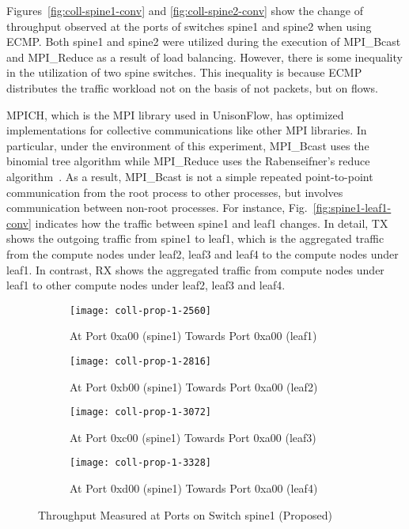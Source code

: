 Figures~\ref{fig:coll-spine1-conv} and \ref{fig:coll-spine2-conv} show
the change of throughput observed at the ports of switches spine1 and
spine2 when using ECMP\@. Both spine1 and spine2 were utilized during the
execution of MPI\_Bcast and MPI\_Reduce as a result of load balancing.
However, there is some inequality in the utilization of two spine
switches. This inequality is because ECMP distributes the traffic
workload not on the basis of not packets, but on flows.

MPICH, which is the MPI library used in UnisonFlow, has optimized
implementations for collective communications like other MPI libraries.
In particular, under the environment of this experiment, MPI\_Bcast uses
the binomial tree algorithm while MPI\_Reduce uses the Rabenseifner's reduce
algorithm~\autocite{Rabenseifner2004}. As a result, MPI\_Bcast is not a
simple repeated point-to-point communication from the root process to
other processes, but involves communication between non-root processes.
For instance, Fig.~\ref{fig:spine1-leaf1-conv} indicates how the traffic
between spine1 and leaf1 changes. In detail, TX shows the outgoing
traffic from spine1 to leaf1, which is the aggregated traffic from the
compute nodes under leaf2, leaf3 and leaf4 to the compute nodes
under leaf1. In contrast, RX shows the aggregated traffic from compute
nodes under leaf1 to other compute nodes under leaf2, leaf3 and leaf4.

\begin{figure}
    \centering
    \begin{subfigure}{.45\linewidth}
        \texttt{[image: coll-prop-1-2560]}
        \caption{At Port 0xa00 (spine1) \newline Towards Port 0xa00 (leaf1)}%
        \label{fig:spine1-leaf1-prop}
    \end{subfigure}
    \begin{subfigure}{.45\linewidth}
        \texttt{[image: coll-prop-1-2816]}
        \caption{At Port 0xb00 (spine1) \newline Towards Port 0xa00 (leaf2)}%
        \label{fig:spine1-leaf2-prop}
    \end{subfigure}
    \begin{subfigure}{.45\linewidth}
        \texttt{[image: coll-prop-1-3072]}
        \caption{At Port 0xc00 (spine1) \newline Towards Port 0xa00 (leaf3)}%
        \label{fig:spine1-leaf3-prop}
    \end{subfigure}
    \begin{subfigure}{.45\linewidth}
        \texttt{[image: coll-prop-1-3328]}
        \caption{At Port 0xd00 (spine1) \newline Towards Port 0xa00 (leaf4)}%
        \label{fig:spine1-leaf4-prop}
    \end{subfigure}
    \caption{Throughput Measured at Ports on Switch spine1 (Proposed)}%
    \label{fig:coll-spine1-prop}
\end{figure}

